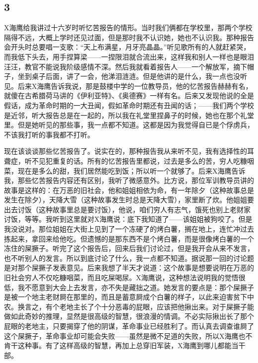 \subsection{3} 

X海鹰给我讲过十六岁时听忆苦报告的情形。当时我们俩都在学校里，那两个学校隔得不远，大概上学时还见过面，但是那时我不认识她，她也不认识我。那种报告会开头时总要唱一支歌：“天上布满星，月牙亮晶晶。”听见歌所有的人就赶紧哭，而我低下头去，用手捏算梁——一捏限泪就合流出来，这样我和别人一样也是眼泪汪汪，教官不能说我阶级感情不深。然后我就看着报告人——一个解放军，摘下帽子，坐到桌子后面，讲了一会，他涕泪涟涟。但是他讲的是什么，我一点也没听见。后来X海鹰告诉我说，那是鼓楼中学的一位教导员，他的忆苦报告赫赫有名，就傻在古希腊荷马讲的《伊利亚特》、《奥德赛》一样有名。后来又发现他说的全是假话，成为革命时期的一大丑闻，假如革命时期还有丑闻的话；——我们两个学校是近邻，听大报告总是在一起的，所以我在礼堂里捏鼻子的时候，她也在那个礼堂里。但是她听见的那些事，我一点都不知道。这都是因为我觉得自已是个俘虏兵，不该我打听的事我都不打听。 

现在该谈谈那些忆苦报告了。说实在的，那种报告我从来听不见，我有选择性的耳聋症，听不见犯重复的话。所有的忆苦报告里都说，过去是多么的苦，穷人吃糠咽菜，现在是多么的甜，我们居然能吃到饭；所以听一个就够了。后来X海鹰告诉我，那些忆苦报告内容还有区别，我听了微感意外。比方说，那位军训教导员讲的故事是这样的：在万恶的旧社会，他和姐姐相依为命，有一年除夕（这种故事总是发生在除夕），天降大雪（这种故事发生时总是天降大雪），家里断了炊。他姐姐要出去讨饭（这种故事里总是要讨饭），他说，咱们穷人有志气，饿死也别上老财家讨饭，等等。我听到这里就对X海鹰说：底下我知道了——该姐姐被狗咬了。但是我没说对。那位姐姐在大街上见到了一个冻硬了的烤白薯，搁在地上，连忙冲过去拣起来，拿回来给他吃。但遗憾的是那东西不是个烤白薯，而是很像烤白薯的一个冻住的屎撅子。听完了这个报告后，回来后我们讨论过，但是我开会从来不发言，也不听别人的发言。所以到底讨论了什么，我一点都不知道。据说那一回的讨论题是对那个屎撅子发表意见。后来我想了半天才说道：这个故事是想要说明在万恶的旧社会穷人不仅吃糠咽菜，而且吃屎喝尿。X海鹰说，这种想法说明我的觉悟很低，我不愿意到大会上去发言，亦不失是藏拙之道。她发言的要点是：那个屎撅子是被一个地主老财屙在那里的，而且是蓄意屙成个白薯的样子，以此来迫害贫下中农。换言之，有个老地主长了个十分恶毒的屁眼，应该把他揪出来。对于屎撅子能做如此奇妙的推理，显然是很高级的智慧，很浪漫的情调。不必实际揪出长了那个屁眼的老地主，只要揭穿了他的阴谋，革命事业已经胜利了。而认真去调查谁屙了这个屎撅子，革命事业却可能会失败——虽然是微不足道的失败，所以X海鹰也不肯干这种事。有了这样高级的智慧，再加上总穿旧军装，X海鹰到哪儿都能当干部。 

